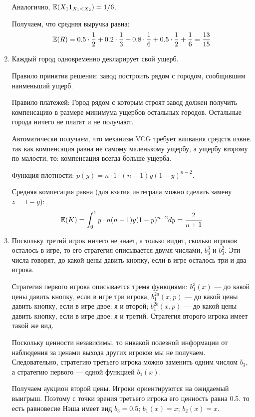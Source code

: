 \begin{enumerate}
Аналогично, $ \mathbb{E}(X_{1}1_{X_{1}<X_{2}})=1/6 $.

Получаем, что средняя выручка равна:
\begin{equation}
\mathbb{E}(R)=0.5\cdot \frac{1}{2}+0.2\cdot \frac{1}{3}+0.8\cdot \frac{1}{6}+0.5\cdot \frac{1}{2}+\frac{1}{6}=\frac{13}{15}
\end{equation}

\item  Каждый город одновременно декларирует свой ущерб.

Правило принятия решения: завод построить рядом с городом, сообщившим наименьший ущерб.

Правило платежей: Город рядом с которым строят завод должен получить компенсацию в размере минимума ущербов остальных городов. Остальные города ничего не платят и не получают.

Автоматически получаем, что механизм VCG требует вливания средств извне. так как компенсация равна не самому маленькому ущербу, а ущербу второму по малости, то: компенсация всегда больше ущерба.

Функция плотности: $ p(y)=n\cdot 1\cdot (n-1)y(1-y)^{n-2} $.

Средняя компесация равна (для взятия интеграла можно сделать замену $ z=1-y $):
\begin{equation}
\mathbb{E}(K)=\int_{0}^{1}y\cdot n(n-1)y(1-y)^{n-2}dy=\frac{2}{n+1}
\end{equation}




\item  Поскольку третий игрок ничего не знает, а только видит, сколько игроков осталось в игре, то его стратегия описывается двумя числами, $ b_{3}^{3} $ и $ b_{3}^{2} $. Эти числа говорят, до какой цены давить кнопку, если в игре осталось три и два игрока.

Стратегия первого игрока описывается тремя функциями: $ b_{1}^{3}(x) $ — до какой цены давить кнопку, если в игре три игрока, $b_{1}^{2a}(x,p)$ — до какой цены давить кнопку, если в игре двое: я и второй; $b_{1}^{2b}(x,p)$ — до какой цены давить кнопку, если в игре двое: я и третий. Стратегия второго игрока имеет такой же вид.

Поскольку ценности независимы, то никакой полезной информации от наблюдения за ценами выхода других игроков мы не получаем. Следовательно, стратегию третьего игрока можно заменить одним числом $ b_{3} $, а стратегию первого — одной функцией $b_{1}(x)$.

Получаем аукцион второй цены. Игроки ориентируются на ожидаемый выигрыш. Поэтому с точки зрения третьего игрока его ценность равна 0.5. то есть равновесие Нэша имеет вид $ b_{3}=0.5 $; $ b_{1}(x)=x $; $ b_{2}(x)=x $.


\end{enumerate}
